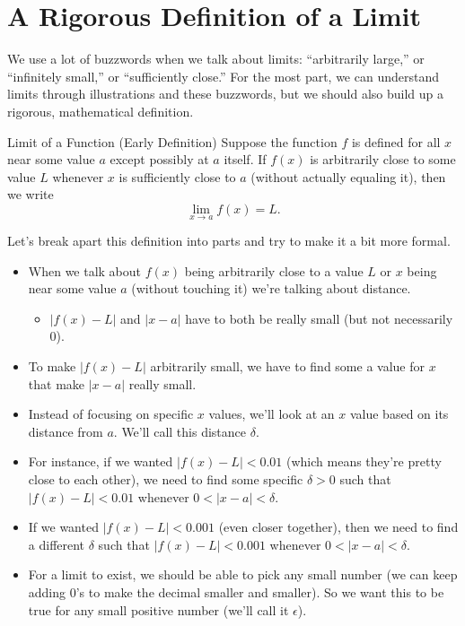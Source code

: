 \section{A Rigorous Definition of a Limit}

We use a lot of buzzwords when we talk about limits: ``arbitrarily large,'' or ``infinitely small,'' or ``sufficiently close.''
For the most part, we can understand limits through illustrations and these buzzwords, but we should also build up a rigorous, mathematical definition.

\begin{defn}{Limit of a Function (Early Definition)}
  Suppose the function $f$ is defined for all $x$ near some value $a$ except possibly at $a$ itself.
  If $f(x)$ is arbitrarily close to some value $L$ whenever $x$ is sufficiently close to $a$ (without actually equaling it), then we write
  \[\lim_{x\to a} f(x) = L.\]
\end{defn}

Let's break apart this definition into parts and try to make it a bit more formal.

\begin{itemize}
  \item When we talk about $f(x)$ being arbitrarily close to a value $L$ or $x$ being near some value $a$ (without touching it) we're talking about distance.
  \begin{itemize}
    \item $|f(x)-L|$ and $|x-a|$ have to both be really small (but not necessarily 0).
  \end{itemize}
  \item To make $|f(x)-L|$ arbitrarily small, we have to find some a value for $x$ that make $|x-a|$ really small.
  \item Instead of focusing on specific $x$ values, we'll look at an $x$ value based on its distance from $a$. We'll call this distance $\delta$.
  \item For instance, if we wanted $|f(x)-L|<0.01$ (which means they're pretty close to each other), we need to find some specific $\delta>0$ such that $|f(x)-L|<0.01$ whenever $0<|x-a|<\delta$.
  \item If we wanted $|f(x)-L|<0.001$ (even closer together), then we need to find a different $\delta$ such that $|f(x)-L|<0.001$ whenever $0<|x-a|<\delta$.
  \item For a limit to exist, we should be able to pick any small number (we can keep adding 0's to make the decimal smaller and smaller).
  So we want this to be true for any small positive number (we'll call it $\epsilon$).
\end{itemize}

